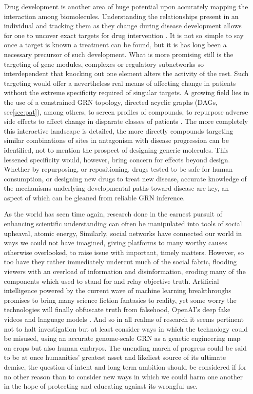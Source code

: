 Drug development is another area of huge potential upon accurately mapping the interaction among biomolecules. Understanding the relationships present in an individual and tracking them as they change during disease development allows for one to uncover exact targets for drug intervention \citep{schreiber2000target}. It is not so simple to say once a target is known a treatment can be found, but it is has long been a necessary precursor of such development. What is more promising still is the targeting of gene modules, complexes or regulatory subnetworks so interdependent that knocking out one element alters the activity of the rest. Such targeting would offer a nevertheless real means of affecting change in patients without the extreme specificity required of singular targets. A growing field lies in the use of a constrained GRN topology, directed acyclic graphs (DAGs, see\cref{sec:pat}), among others, to screen profiles of compounds, to repurpose adverse side effects to affect change in disparate classes of patients \citep{alaimo2016recommendation}. The more completely this interactive landscape is detailed, the more directly compounds targeting similar combinations of sites in antagonism with disease progression can be identified, not to mention the prospect of designing generic molecules. This lessened specificity would, however, bring concern for effects beyond design. Whether by repurposing, or repositioning, drugs tested to be safe for human consumption, or designing new drugs to treat new disease, accurate knowledge of the mechanisms underlying developmental paths toward disease are key, an aspect of which can be gleaned from reliable GRN inference.

As the world has seen time again, research done in the earnest pursuit of enhancing scientific understanding can often be manipulated into tools of social upheaval, \eg atomic energy, \etc Similarly, social networks have connected our world in ways we could not have imagined, giving platforms to many worthy causes otherwise overlooked, to raise issue with important, timely matters. However, so too have they rather immediately undercut much of the social fabric, flooding viewers with an overload of information and disinformation, eroding many of the components which used to stand for and relay objective truth. Artificial intelligence powered by the current wave of machine learning breakthroughs promises to bring many science fiction fantasies to reality, yet some worry the technologies will finally obfuscate truth from falsehood, \ie OpenAI's deep fake videos and language models \citep{liu2019recurrent}. And so in all realms of research it seems pertinent not to halt investigation but at least consider ways in which the technology could be misused, \eg using an accurate genome-scale GRN as a genetic engineering map on crops but also human embryos. The unending march of progress could be said to be at once humanities' greatest asset and likeliest source of its ultimate demise, the question of intent and long term ambition should be considered if for no other reason than to consider new ways in which we could harm one another in the hope of protecting and educating against its wrongful use.